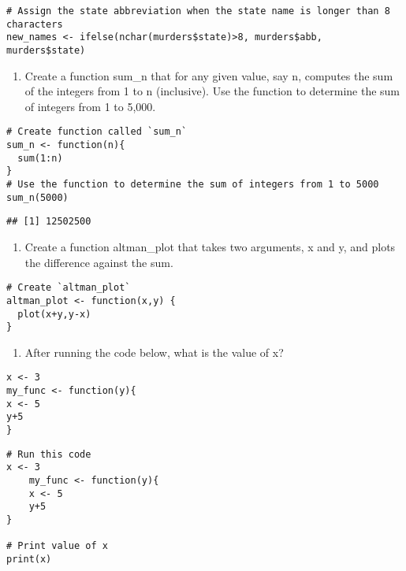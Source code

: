 \documentclass[]{article}
\providecommand{\tightlist}{%
  \setlength{\itemsep}{0pt}\setlength{\parskip}{0pt}}
\begin{document}
\begin{verbatim}
# Assign the state abbreviation when the state name is longer than 8 characters 
new_names <- ifelse(nchar(murders$state)>8, murders$abb, murders$state)
\end{verbatim}

\begin{enumerate}
\def\labelenumi{\arabic{enumi}.}
\setcounter{enumi}{3}
\tightlist
\item
  Create a function sum\_n that for any given value, say n, computes the
  sum of the integers from 1 to n (inclusive). Use the function to
  determine the sum of integers from 1 to 5,000.
\end{enumerate}

\begin{verbatim}
# Create function called `sum_n`
sum_n <- function(n){
  sum(1:n)
}
# Use the function to determine the sum of integers from 1 to 5000
sum_n(5000)
\end{verbatim}

\begin{verbatim}
## [1] 12502500
\end{verbatim}

\begin{enumerate}
\def\labelenumi{\arabic{enumi}.}
\setcounter{enumi}{4}
\tightlist
\item
  Create a function altman\_plot that takes two arguments, x and y, and
  plots the difference against the sum.
\end{enumerate}

\begin{verbatim}
# Create `altman_plot` 
altman_plot <- function(x,y) {
  plot(x+y,y-x)
}
\end{verbatim}

\begin{enumerate}
\def\labelenumi{\arabic{enumi}.}
\setcounter{enumi}{5}
\tightlist
\item
  After running the code below, what is the value of x?
\end{enumerate}

\begin{verbatim}
x <- 3
my_func <- function(y){
x <- 5
y+5
}
\end{verbatim}

\begin{verbatim}
# Run this code 
x <- 3
    my_func <- function(y){
    x <- 5
    y+5
}

# Print value of x 
print(x)
\end{verbatim}
\end{document}
